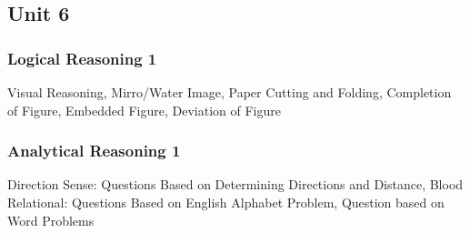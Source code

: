 \documentclass{article}
\begin{document}
\begin{multicols*}{2}
    \subsection*{Unit 6}
    \subsubsection*{Logical Reasoning 1}
    Visual Reasoning, Mirro/Water Image, Paper Cutting and Folding, Completion of Figure, Embedded Figure, Deviation of Figure
    \subsubsection*{Analytical Reasoning 1}
    Direction Sense: Questions Based on Determining Directions and Distance, Blood Relational: Questions Based on English Alphabet Problem, Question based on Word Problems
\end{multicols*}
\end{document}
